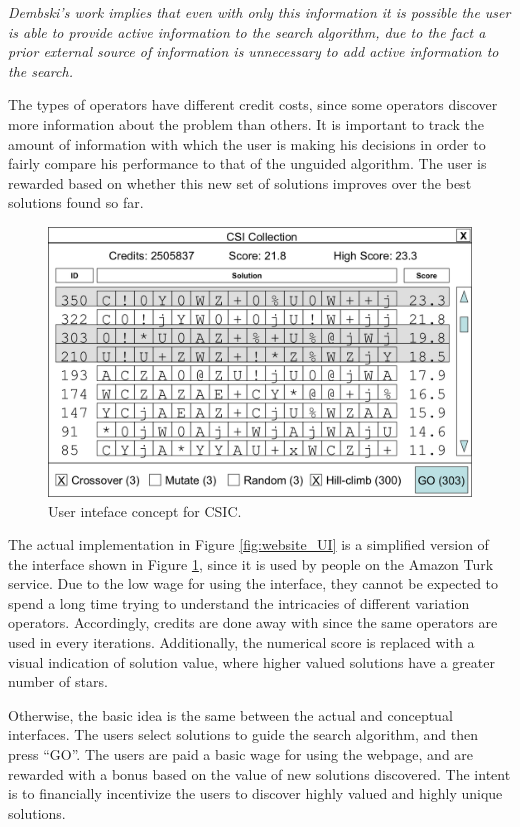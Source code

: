  \emph{ Dembski's work implies that even with only this information it is possible the user is able to provide active information to the search algorithm, due to the fact a prior external source of information is unnecessary to add active information to the search.}    

The types of operators have different credit costs, since some operators discover more information about the problem than others. It is important to track the amount of information with which the user is making his decisions in order to fairly compare his performance to that of the unguided algorithm.  The user is rewarded based on whether this new set of solutions improves over the best solutions found so far.  

\begin{figure}[!t]
  \centering
  \includegraphics[width=4.5in]{HollowayCSICUI2}
  \caption{User inteface concept for CSIC.}
  \label{fig:CSIC_UI}
\end{figure}

The actual implementation in Figure \ref{fig:website_UI} is a simplified version of the interface shown in Figure \ref{fig:CSIC_UI}, since it is used by people on the Amazon Turk service.  Due to the low wage for using the interface, they cannot be expected to spend a long time trying to understand the intricacies of different variation operators.  Accordingly, credits are done away with since the same operators are used in every iterations.  Additionally, the numerical score is replaced with a visual indication of solution value, where higher valued solutions have a greater number of stars.

Otherwise, the basic idea is the same between the actual and conceptual interfaces.  The users select solutions to guide the search algorithm, and then press ``GO''.  The users are paid a basic wage for using the webpage, and are rewarded with a bonus based on the value of new solutions discovered.  The intent is to financially incentivize the users to discover highly valued and highly unique solutions. 

